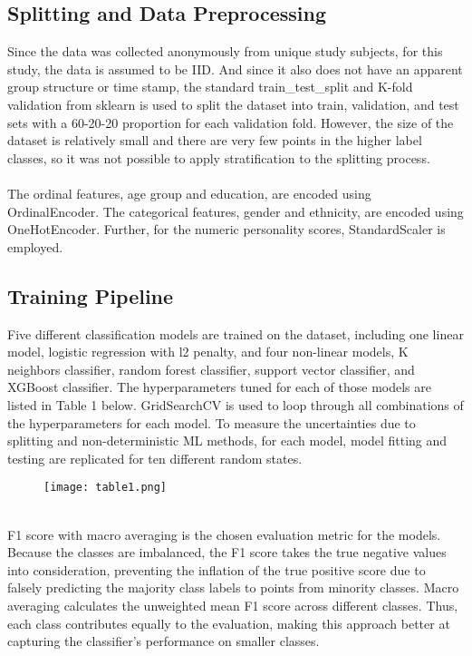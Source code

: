 \documentclass[12pt]{article}
\begin{document}
\subsection{Splitting and Data Preprocessing}
Since the data was collected anonymously from unique study subjects, for this study, the data is assumed to be IID. And since it also does not have an apparent group structure or time stamp, the standard train\_test\_split and K-fold validation from sklearn is used to split the dataset into train, validation, and test sets with a 60-20-20 proportion for each validation fold. However,  the size of the dataset is relatively small and there are very few points in the higher label classes, so it was not possible to apply stratification to the splitting process.\\
\\
The ordinal features, age group and education, are encoded using OrdinalEncoder. The categorical features, gender and ethnicity, are encoded using OneHotEncoder. Further, for the numeric personality scores, StandardScaler is employed.

\subsection{Training Pipeline}
Five different classification models are trained on the dataset, including one linear model, logistic regression with l2 penalty, and four non-linear models, K neighbors classifier, random forest classifier, support vector classifier, and XGBoost classifier. The hyperparameters tuned for each of those models are listed in Table 1 below. GridSearchCV is used to loop through all combinations of the hyperparameters for each model. To measure the uncertainties due to splitting and non-deterministic ML methods, for each model, model fitting and testing are replicated for ten different random states.\\
\begin{figure}[!h]
\centering
\texttt{[image: table1.png]}
\end{figure}
\\
F1 score with macro averaging is the chosen evaluation metric for the models. Because the classes are imbalanced, the F1 score takes the true negative values into consideration, preventing the inflation of the true positive score due to falsely predicting the majority class labels to points from minority classes. Macro averaging calculates the unweighted mean F1 score across different classes. Thus, each class contributes equally to the evaluation, making this approach better at capturing the classifier’s performance on smaller classes. 
\end{document}
